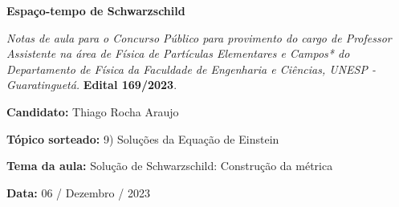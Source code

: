 \begin{center}
  \Large\textbf{Espaço-tempo de Schwarzschild}
\end{center}

\vspace{1.0cm}

\emph{Notas de aula para o Concurso Público para provimento do cargo de
Professor Assistente na área de Física de Partículas Elementares e
Campos* do Departamento de Física da Faculdade de Engenharia e Ciências,
UNESP - Guaratinguetá.} \textbf{Edital 169/2023}.

\textbf{Candidato:} Thiago Rocha Araujo

\textbf{Tópico sorteado:} 9) Soluções da Equação de Einstein

\textbf{Tema da aula:} Solução de Schwarzschild: Construção da métrica

\textbf{Data:} 06 / Dezembro / 2023


\tableofcontents
    

\clearpage 
